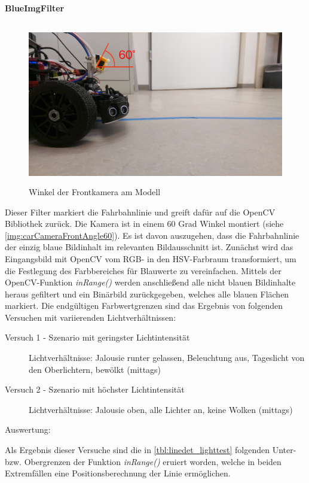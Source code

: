 \documentclass[12pt, a4paper]{scrartcl}
\begin{document}
\paragraph{BlueImgFilter}
\begin{figure}[h]
	\centering
	\includegraphics[width=\textwidth, height=7cm, keepaspectratio]{Bilder/carCameraFrontAngle60.jpg}
	\caption{Winkel der Frontkamera am Modell}
	\label{img:carCameraFrontAngle60}
\end{figure}

Dieser Filter markiert die Fahrbahnlinie und greift dafür auf die OpenCV Bibliothek zurück. Die Kamera ist in einem 60 Grad Winkel montiert (siehe \autoref{img:carCameraFrontAngle60}). Es ist davon auszugehen, dass die Fahrbahnlinie der einzig blaue Bildinhalt im relevanten Bildausschnitt ist. Zunächst wird das Eingangsbild mit OpenCV vom RGB- in den HSV-Farbraum transformiert, um die Festlegung des Farbbereiches für Blauwerte zu vereinfachen. Mittels der OpenCV-Funktion \emph{inRange()} werden anschließend alle nicht blauen Bildinhalte heraus gefiltert und ein Binärbild zurückgegeben, welches alle blauen Flächen markiert. Die endgültigen Farbwertgrenzen sind das Ergebnis von folgenden Versuchen mit variierenden Lichtverhältnissen:

\begin{description}
	\item[Versuch 1 - Szenario mit geringster Lichtintensität]
	Lichtverhältnisse:	Jalousie runter gelassen, Beleuchtung aus, Tageslicht von den Oberlichtern, bewölkt (mittags)
	\item[Versuch 2 - Szenario mit höchster Lichtintensität]
	Lichtverhältnisse:	Jalousie oben, alle Lichter an, keine Wolken (mittags) 
\end{description}

Auswertung:

Als Ergebnis dieser Versuche sind die in \autoref{tbl:linedet_lighttest} folgenden Unter- bzw. Obergrenzen der Funktion \emph{inRange()} eruiert worden, welche in beiden Extremfällen eine Positionsberechnung der Linie ermöglichen.
\end{document}
